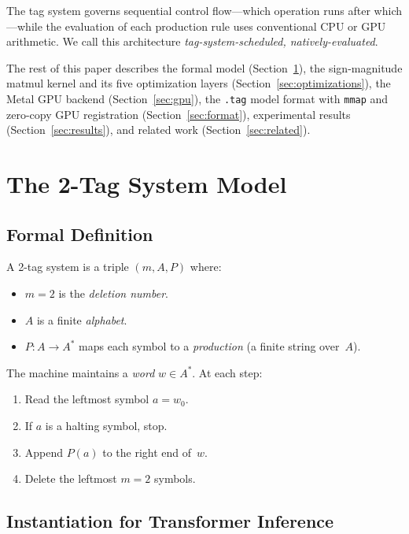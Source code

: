 \documentclass[acmsmall,nonacm]{acmart}
\begin{document}
The tag system governs sequential control flow---which operation
runs after which---while the evaluation of each production rule
uses conventional CPU or GPU arithmetic.  We call this architecture
\emph{tag-system-scheduled, natively-evaluated}.

The rest of this paper describes the formal model
(Section~\ref{sec:model}), the sign-magnitude matmul kernel and its
five optimization layers (Section~\ref{sec:optimizations}), the Metal
GPU backend (Section~\ref{sec:gpu}), the \texttt{.tag} model format
with \texttt{mmap} and zero-copy GPU registration
(Section~\ref{sec:format}), experimental results
(Section~\ref{sec:results}), and related work
(Section~\ref{sec:related}).


\section{The 2-Tag System Model}
\label{sec:model}

\subsection{Formal Definition}

A 2-tag system is a triple $(m, A, P)$ where:
\begin{itemize}
\item $m = 2$ is the \emph{deletion number}.
\item $A$ is a finite \emph{alphabet}.
\item $P : A \to A^*$ maps each symbol to a \emph{production}
  (a finite string over~$A$).
\end{itemize}

The machine maintains a \emph{word} $w \in A^*$.  At each step:
\begin{enumerate}
\item Read the leftmost symbol $a = w_0$.
\item If $a$ is a halting symbol, stop.
\item Append $P(a)$ to the right end of~$w$.
\item Delete the leftmost $m = 2$ symbols.
\end{enumerate}

\subsection{Instantiation for Transformer Inference}
\end{document}
